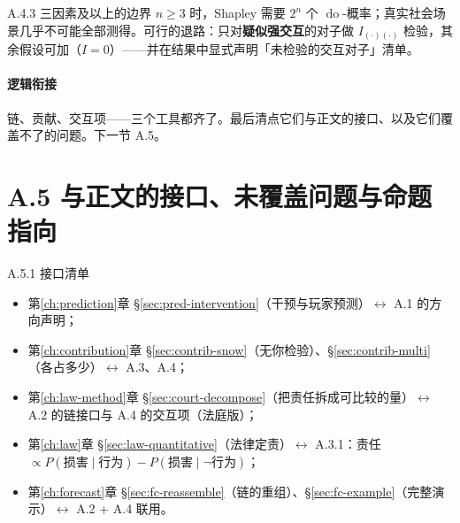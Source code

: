 \documentclass[../../main2.tex]{subfiles}
\begin{document}
	\begin{mathbox}{A.4.3 三因素及以上的边界}
		$n \ge 3$ 时，Shapley 需要 $2^n$ 个 $\operatorname{do}$-概率；真实社会场景几乎不可能全部测得。可行的退路：只对\textbf{疑似强交互}的对子做 $I_{(\cdot)(\cdot)}$ 检验，其余假设可加（$I = 0$）——并在结果中显式声明「未检验的交互对子」清单。
	\end{mathbox}

	\paragraph*{逻辑衔接}
	链、贡献、交互项——三个工具都齐了。最后清点它们与正文的接口、以及它们覆盖不了的问题。下一节 A.5。

	\section{A.5 与正文的接口、未覆盖问题与命题指向}
	\label{app:interface}

	\begin{mathbox}{A.5.1 接口清单}
		\begin{itemize}
			\item 第\ref{ch:prediction}章 §\ref{sec:pred-intervention}（干预与玩家预测）$\leftrightarrow$ A.1 的方向声明；
			\item 第\ref{ch:contribution}章 §\ref{sec:contrib-snow}（无你检验）、§\ref{sec:contrib-multi}（各占多少）$\leftrightarrow$ A.3、A.4；
			\item 第\ref{ch:law-method}章 §\ref{sec:court-decompose}（把责任拆成可比较的量）$\leftrightarrow$ A.2 的链接口与 A.4 的交互项（法庭版）；
			\item 第\ref{ch:law}章 §\ref{sec:law-quantitative}（法律定责）$\leftrightarrow$ A.3.1：责任 $\propto P(\text{损害} \mid \text{行为}) - P(\text{损害} \mid \neg \text{行为})$；
			\item 第\ref{ch:forecast}章 §\ref{sec:fc-reassemble}（链的重组）、§\ref{sec:fc-example}（完整演示）$\leftrightarrow$ A.2 + A.4 联用。
		\end{itemize}
	\end{mathbox}
\end{document}
